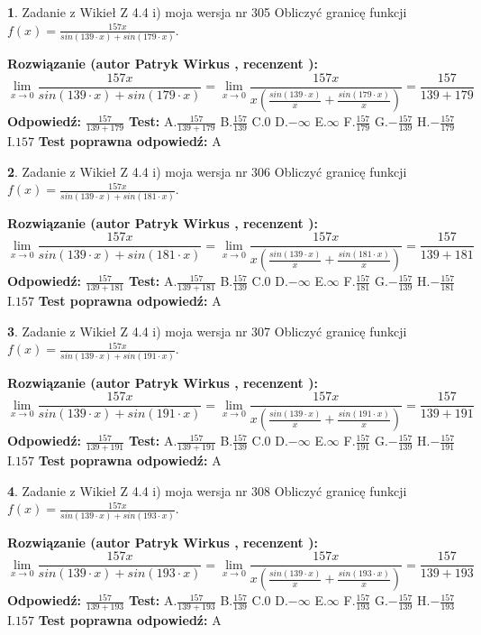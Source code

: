 \documentclass[12pt, a4paper]{article}
\theoremstyle{definition} %
\newtheorem{zad}{}
\newcommand{\zadStart}[1]{\begin{zad}#1\newline}
\newcommand{\zadStop}{\end{zad}}
\newcommand{\rozwStart}[2]{\noindent \textbf{Rozwiązanie (autor #1 , recenzent #2): }\newline}
\newcommand{\rozwStop}{\newline}
\newcommand{\odpStart}{\noindent \textbf{Odpowiedź:}\newline}
\newcommand{\odpStop}{\newline}
\newcommand{\testStart}{\noindent \textbf{Test:}\newline}
\newcommand{\testStop}{\newline}
\newcommand{\kluczStart}{\noindent \textbf{Test poprawna odpowiedź:}\newline}
\newcommand{\kluczStop}{\newline}
\begin{document}
\zadStart{Zadanie z Wikieł Z 4.4 i) moja wersja nr 305}
Obliczyć granicę funkcji $f(x)=\frac{157x}{sin(139\cdot x) +sin(179\cdot x)}$.
\zadStop
\rozwStart{Patryk Wirkus}{}
$$\lim\limits_{x\to 0}\frac{157x}{sin(139\cdot x) +sin(179\cdot x)}=\lim\limits_{x\to 0}\frac{157x}{x(\frac{sin(139\cdot x)}{x}+\frac{sin(179\cdot x)}{x})}=\frac{157}{139+179}$$
\rozwStop
\odpStart
$\frac{157}{139+179}$
\odpStop
\testStart
A.$\frac{157}{139+179}$
B.$\frac{157}{139}$
C.$0$
D.$-\infty$
E.$\infty$
F.$\frac{157}{179}$
G.$-\frac{157}{139}$
H.$-\frac{157}{179}$
I.$157$
\testStop
\kluczStart
A
\kluczStop



\zadStart{Zadanie z Wikieł Z 4.4 i) moja wersja nr 306}
Obliczyć granicę funkcji $f(x)=\frac{157x}{sin(139\cdot x) +sin(181\cdot x)}$.
\zadStop
\rozwStart{Patryk Wirkus}{}
$$\lim\limits_{x\to 0}\frac{157x}{sin(139\cdot x) +sin(181\cdot x)}=\lim\limits_{x\to 0}\frac{157x}{x(\frac{sin(139\cdot x)}{x}+\frac{sin(181\cdot x)}{x})}=\frac{157}{139+181}$$
\rozwStop
\odpStart
$\frac{157}{139+181}$
\odpStop
\testStart
A.$\frac{157}{139+181}$
B.$\frac{157}{139}$
C.$0$
D.$-\infty$
E.$\infty$
F.$\frac{157}{181}$
G.$-\frac{157}{139}$
H.$-\frac{157}{181}$
I.$157$
\testStop
\kluczStart
A
\kluczStop



\zadStart{Zadanie z Wikieł Z 4.4 i) moja wersja nr 307}
Obliczyć granicę funkcji $f(x)=\frac{157x}{sin(139\cdot x) +sin(191\cdot x)}$.
\zadStop
\rozwStart{Patryk Wirkus}{}
$$\lim\limits_{x\to 0}\frac{157x}{sin(139\cdot x) +sin(191\cdot x)}=\lim\limits_{x\to 0}\frac{157x}{x(\frac{sin(139\cdot x)}{x}+\frac{sin(191\cdot x)}{x})}=\frac{157}{139+191}$$
\rozwStop
\odpStart
$\frac{157}{139+191}$
\odpStop
\testStart
A.$\frac{157}{139+191}$
B.$\frac{157}{139}$
C.$0$
D.$-\infty$
E.$\infty$
F.$\frac{157}{191}$
G.$-\frac{157}{139}$
H.$-\frac{157}{191}$
I.$157$
\testStop
\kluczStart
A
\kluczStop



\zadStart{Zadanie z Wikieł Z 4.4 i) moja wersja nr 308}
Obliczyć granicę funkcji $f(x)=\frac{157x}{sin(139\cdot x) +sin(193\cdot x)}$.
\zadStop
\rozwStart{Patryk Wirkus}{}
$$\lim\limits_{x\to 0}\frac{157x}{sin(139\cdot x) +sin(193\cdot x)}=\lim\limits_{x\to 0}\frac{157x}{x(\frac{sin(139\cdot x)}{x}+\frac{sin(193\cdot x)}{x})}=\frac{157}{139+193}$$
\rozwStop
\odpStart
$\frac{157}{139+193}$
\odpStop
\testStart
A.$\frac{157}{139+193}$
B.$\frac{157}{139}$
C.$0$
D.$-\infty$
E.$\infty$
F.$\frac{157}{193}$
G.$-\frac{157}{139}$
H.$-\frac{157}{193}$
I.$157$
\testStop
\kluczStart
A
\kluczStop
\end{document}
